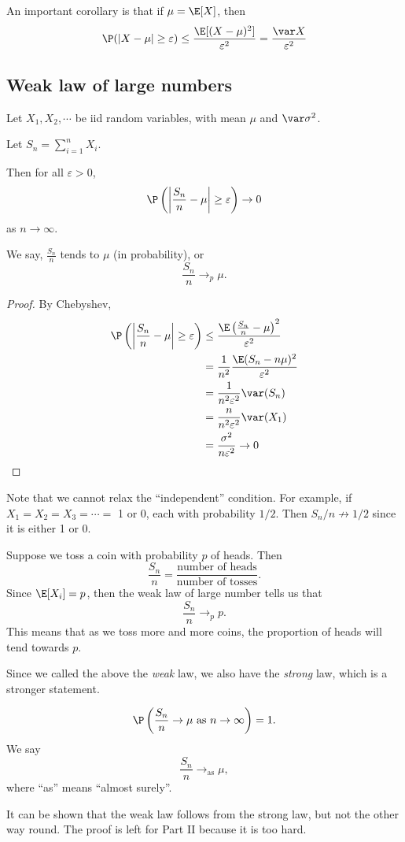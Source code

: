 \documentclass[a4paper]{article}
\begin{document}
An important corollary is that if $\mu = \E[X]$, then
\[
  \P(|X - \mu| \geq \varepsilon) \leq \frac{\E[(X - \mu)^2]}{\varepsilon^2} = \frac{\var X}{\varepsilon^2}
\]

\subsection{Weak law of large numbers}
\begin{thm}
  Let $X_1, X_2, \cdots$ be iid random variables, with mean $\mu$ and $\var \sigma^2$.

  Let $S_n = \sum_{i = 1}^n X_i$.

  Then for all $\varepsilon > 0$,
  \[
    \P\left(\left|\frac{S_n}{n} - \mu\right| \geq \varepsilon\right) \to 0
  \]
  as $n\to \infty$.

  We say, $\frac{S_n}{n}$ tends to $\mu$ (in probability), or
  \[
    \frac{S_n}{n}\to_p \mu.
  \]
\end{thm}

\begin{proof}
  By Chebyshev,
  \begin{align*}
    \P\left(\left|\frac{S_n}{n} - \mu\right| \geq \varepsilon\right)&\leq \frac{\E\left(\frac{S_n}{n} - \mu\right)^2}{\varepsilon^2}\\
    &= \frac{1}{n^2}\frac{\E(S_n -n\mu)^2}{\varepsilon^2}\\
    &= \frac{1}{n^2\varepsilon^2}\var (S_n)\\
    &= \frac{n}{n^2\varepsilon^2}\var (X_1)\\
    &= \frac{\sigma^2}{n\varepsilon^2} \to 0
  \end{align*}
\end{proof}

Note that we cannot relax the ``independent'' condition. For example, if $X_1 = X_2 = X_3 = \cdots = $ 1 or 0, each with probability $1/2$. Then $S_n/n \not\to 1/2$ since it is either 1 or 0.

\begin{eg}
  Suppose we toss a coin with probability $p$ of heads. Then
  \[
    \frac{S_n}{n} = \frac{\text{number of heads}}{\text{number of tosses}}.
  \]
  Since $\E[X_i] = p$, then the weak law of large number tells us that
  \[
    \frac{S_n}{n} \to_p p.
  \]
  This means that as we toss more and more coins, the proportion of heads will tend towards $p$.
\end{eg}

Since we called the above the \emph{weak} law, we also have the \emph{strong} law, which is a stronger statement.
\begin{thm}
  \[
    \P\left(\frac{S_n}{n}\to \mu\text{ as }n\to \infty\right) = 1.
  \]
  We say
  \[
    \frac{S_n}{n}\to_{\mathrm{as}} \mu,
  \]
  where ``as'' means ``almost surely''.
\end{thm}
It can be shown that the weak law follows from the strong law, but not the other way round. The proof is left for Part II because it is too hard.
\end{document}
